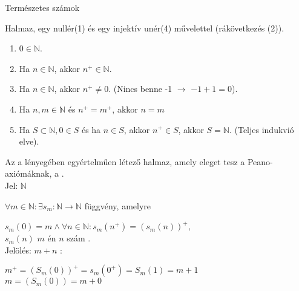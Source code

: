 \begin{frame}
  \begin{tcolorbox}
    {\RHuge Természetes számok}
  \end{tcolorbox}
\end{frame}

\begin{frame}
  \begin{tcolorbox}[title={Def.: Peano-axiómák}]
      Halmaz, egy nullér(1) és egy injektív unér(4) művelettel (rákövetkezés (2)).\\
      \mmedskip
      
      \begin{enumerate}
        \item $0 \in \mathbb{N}$.
        \item Ha $n \in \mathbb{N}$, akkor $n^+ \in \mathbb{N}$.
        \item Ha $n \in \mathbb{N}$, akkor $n^+ \neq 0$. (Nincs benne -1 $\rightarrow$ $-1 + 1 = 0$).
        \item Ha $n, m \in \mathbb{N}$ és $n^+ = m^+$, akkor $n = m$
        \item Ha $S \subset \mathbb{N}, 0 \in S$ és ha $n \in S$, akkor $n^+ \in S$, akkor $S = \mathbb{N}$. (Teljes indukvió elve).
      \end{enumerate}
  \end{tcolorbox}


  \begin{tcolorbox}[title={Def.: Természetes számok halmaza}]
    Az a lényegében egyértelműen létező halmaz, amely eleget tesz a Peano-axiómáknak, a .\\
    Jel: $\mathbb{N}$
  \end{tcolorbox}
\end{frame}

\begin{frame}
  \begin{tcolorbox}[title={Def.: Összeadás}]
    ${\forall}m \in \mathbb{N} : {\exists} s_m : \mathbb{N} \rightarrow \mathbb{N}$ függvény, amelyre\\
    \mmedskip

    $s_m(0) = m \land {\forall}n \in \mathbb{N} : s_m(n^+) = (s_m(n))^+$,\\
    $s_m(n)$ $m$ én $n$ szám .\\
    Jelölés: $m + n$
  \tcblower
    :\\
    \mmedskip
  
    $m^+ = (S_m(0))^+ = s_m(0^+) = S_m(1) = m + 1$\\
    $m = (S_m(0)) = m + 0$
  \end{tcolorbox}
\end{frame}

